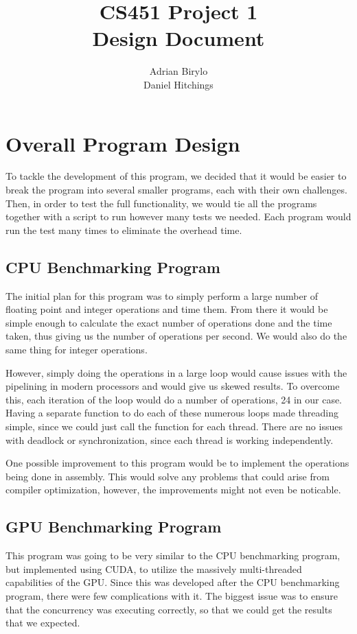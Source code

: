 \documentclass{article}
\title{CS451 Project 1 \\ Design Document}
\author{Adrian Birylo \\ Daniel Hitchings}
\begin{document}
\maketitle
\bigskip 

\section{Overall Program Design}
To tackle the development of this program, we decided that it would be easier to break the program into several smaller programs, each with their own challenges.  Then, in order to test the full functionality, we would tie all the programs together with a script to run however many tests we needed. Each program would run the test many times to eliminate the overhead time.
\subsection{CPU Benchmarking Program}
The initial plan for this program was to simply perform a large number of floating point and integer operations and time them.  From there it would be simple enough to calculate the exact number of operations done and the time taken, thus giving us the number of operations per second.  We would also do the same thing for integer operations.

However, simply doing the operations in a large loop would cause issues with the pipelining in modern processors and would give us skewed results.  To overcome this, each iteration of the loop would do a number of operations, 24 in our case.  Having a separate function to do each of these numerous loops made threading simple, since we could just call the function for each thread.  There are no issues with deadlock or synchronization, since each thread is working independently.

One possible improvement to this program would be to implement the operations being done in assembly.  This would solve any problems that could arise from compiler optimization, however, the improvements might not even be noticable.

\subsection{GPU Benchmarking Program}
This program was going to be very similar to the CPU benchmarking program, but implemented using CUDA, to utilize the massively multi-threaded capabilities of the GPU.  Since this was developed after the CPU benchmarking program, there were few complications with it.  The biggest issue was to ensure that the concurrency was executing correctly, so that we could get the results that we expected.
\end{document}
